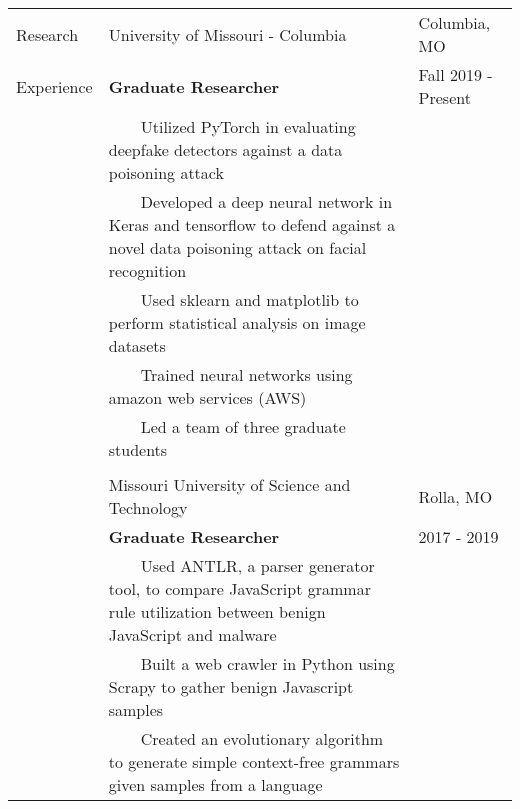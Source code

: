 \documentclass[10.5pt, arial]{article}
\newcommand{\tabitem}{~~\llap{\textbullet}~~}
\begin{document}
\begin{tabular}{p{1.5cm} p{13.2cm} l}
Research    & University of Missouri - Columbia                             & Columbia, MO          \\
Experience  & \textbf{Graduate Researcher}                                  & Fall 2019 - Present   \\ 
            & \tabitem Utilized PyTorch in evaluating deepfake detectors against a data poisoning attack \\
            & \tabitem Developed a deep neural network in Keras and tensorflow to defend against a novel data poisoning attack on facial recognition \\
            & \tabitem Used sklearn and matplotlib to perform statistical analysis on image datasets \\
            & \tabitem Trained neural networks using amazon web services (AWS) &                   \\
            & \tabitem Led a team of three graduate students  \\
\\
            & Missouri University of Science and Technology                 & Rolla, MO             \\
            & \textbf{Graduate Researcher}                                  & 2017 - 2019           \\
            & \tabitem Used ANTLR, a parser generator tool, to compare JavaScript grammar rule utilization between benign JavaScript and malware \\
            & \tabitem Built a web crawler in Python using Scrapy to gather benign Javascript samples \\
            & \tabitem Created an evolutionary algorithm to generate simple context-free grammars given samples from a language \\
\end{tabular}
\end{document}
